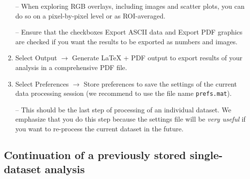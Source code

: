 \documentclass[a4paper, 11pt]{article}
\newcommand{\ttt}[1]{\texttt{#1}}
\newcommand{\lans}[1]{{\color{magenta}#1}}
\newcommand{\lanscb}[1]{{\color{darkgreen}#1}}
\newcommand\mnote{\marginnote{\fbox{\textbf{\bf Note}}}}
\newcommand\ra{\rightarrow}
\newcommand\addon[1]{-- {\small #1}}
\begin{document}
\begin{enumerate}
\addon{When exploring RGB overlays, including images and scatter plots, you can do so on a \lanscb{pixel-by-pixel} level or as \lanscb{ROI-averaged}.}

\addon{Ensure that the checkboxes \lanscb{Export ASCII data} and \lanscb{Export PDF graphics} are checked if you want the results to be exported as numbers and images.}

\item Select \lans{Output} $\ra$ \lans{Generate LaTeX + PDF output} to export results of your analysis in a comprehensive PDF file. 


\item Select \lans{Preferences} $\ra$ \lans{Store preferences} to save the settings of the current data processing session (we recommend to use the file name \ttt{prefs.mat}).

\addon{This should be the last step of processing of an individual dataset. We emphasize that you do this step because the settings file will be \emph{very useful} if you want to re-process the current dataset in the future.}


\end{enumerate}


\subsection{Continuation of a previously stored single-dataset analysis}
\end{document}
